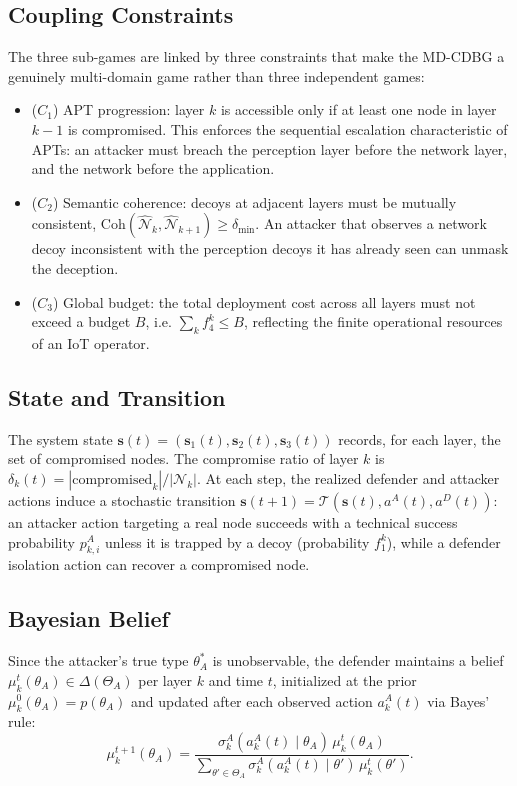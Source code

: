 \documentclass[conference]{IEEEtran}
\newcommand{\Coh}{\mathrm{Coh}}
\begin{document}
\subsection{Coupling Constraints}

The three sub-games are linked by three constraints that make the MD-CDBG a
genuinely multi-domain game rather than three independent games:
\begin{itemize}
\item ($C_1$) APT progression: layer $k$ is accessible only if at
least one node in layer $k-1$ is compromised. This enforces the sequential
escalation characteristic of APTs: an attacker must breach the perception layer
before the network layer, and the network before the application.
\item ($C_2$) Semantic coherence: decoys at adjacent layers must be
mutually consistent, $\Coh(\hat{\mathcal{N}}_k,\hat{\mathcal{N}}_{k+1}) \geq
\delta_{\min}$. An attacker that observes a network decoy inconsistent with the
perception decoys it has already seen can unmask the deception.
\item ($C_3$) Global budget: the total deployment cost across all
layers must not exceed a budget $B$, i.e. $\sum_k f_4^k \leq B$, reflecting the
finite operational resources of an IoT operator.
\end{itemize}

\subsection{State and Transition}

The system state $\mathbf{s}(t) = (\mathbf{s}_1(t), \mathbf{s}_2(t),
\mathbf{s}_3(t))$ records, for each layer, the set of compromised nodes. The
compromise ratio of layer $k$ is $\delta_k(t) = |\text{compromised}_k| /
|\mathcal{N}_k|$. At each step, the realized defender and attacker actions
induce a stochastic transition $\mathbf{s}(t{+}1) =
\mathcal{T}(\mathbf{s}(t), a^A(t), a^D(t))$: an attacker action targeting a real
node succeeds with a technical success probability $p_{k,i}^A$ unless it is
trapped by a decoy (probability $f_1^k$), while a defender isolation action can
recover a compromised node.

\subsection{Bayesian Belief}

Since the attacker's true type $\theta_A^*$ is unobservable, the defender
maintains a belief $\mu_k^t(\theta_A) \in \Delta(\Theta_A)$ per layer
$k$ and time $t$, initialized at the prior $\mu_k^0(\theta_A) = p(\theta_A)$ and
updated after each observed action $a_k^A(t)$ via Bayes' rule:
\begin{equation}
\mu_k^{t+1}(\theta_A) =
\frac{\sigma_k^A(a_k^A(t)\mid\theta_A)\,\mu_k^t(\theta_A)}
{\sum_{\theta'\in\Theta_A}\sigma_k^A(a_k^A(t)\mid\theta')\,\mu_k^t(\theta')}.
\label{eq:bayes}
\end{equation}
\end{document}

